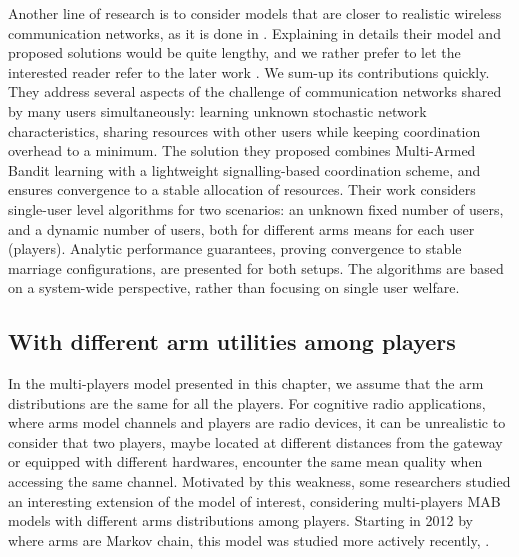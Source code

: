 Another line of research is to consider models that are closer to realistic wireless communication networks, as it is done in \cite{Avner16,AvnerMannor18}.
Explaining in details their model and proposed solutions would be quite lengthy, and we rather prefer to let the interested reader refer to the later work \cite{AvnerMannor18}.
We sum-up its contributions quickly.
They address several aspects of the challenge of communication networks shared by many users simultaneously: learning unknown stochastic network characteristics, sharing resources with other users while keeping coordination overhead to a minimum.
The solution they proposed combines Multi-Armed Bandit learning with a lightweight signalling-based coordination scheme, and ensures convergence to a stable allocation of resources.
Their work considers single-user level algorithms for two scenarios: an unknown fixed number of users, and a dynamic number of users, both for different arms means for each user (players).
Analytic performance guarantees, proving convergence to stable marriage configurations, are presented for both setups. The algorithms are based on a system-wide perspective, rather than focusing on single user welfare.



\subsection{With different arm utilities among players}
\label{sub:5:withDifferentMeansAmongPlayers}

In the multi-players model presented in this chapter, we assume that the arm distributions are the same for all the players.
For cognitive radio applications, where arms model channels and players are radio devices, it can be unrealistic to consider that two players, maybe located at different distances from the gateway or equipped with different hardwares, encounter the same mean quality when accessing the same channel.
%
Motivated by this weakness, some researchers studied an interesting extension of the model of interest, considering multi-players MAB models with different arms distributions among players.
%
Starting in 2012 by \cite{Kalathil12} where arms are Markov chain, this model was studied more actively recently, \cite{DarakHanawal18,Bistritz18,KaufmannAbbas19,Tibrewal2019}.

